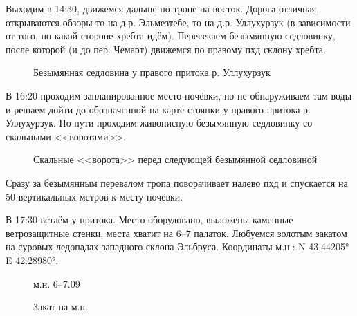 Выходим в 14:30, движемся дальше по тропе на восток. Дорога отличная, открываются обзоры то на д.р. Эльмезтебе, то на д.р. Уллухурзук (в зависимости от того, по какой стороне хребта идём). Пересекаем безымянную седловинку, после которой (и до пер. Чемарт) движемся по правому пхд склону хребта.

\begin{figure}[h!]
	\centering
	\caption{Безымянная седловина у правого притока р. Уллухурзук}
	\label{fig:saddle}
\end{figure}


В 16:20 проходим запланированное место ночёвки, но не обнаруживаем там воды и решаем дойти до обозначенной на карте стоянки у правого притока р. Уллухурзук. По пути проходим живописную безымянную седловинку со скальными <<воротами>>.

\begin{figure}[h!]
	\centering
	\caption{Скальные <<ворота>> перед следующей безымянной седловиной}
	\label{fig:gate}
\end{figure}
 
Сразу за безымянным перевалом тропа поворачивает налево пхд и спускается на 50 вертикальных метров к месту ночёвки.

В 17:30 встаём у притока. Место оборудовано, выложены каменные ветрозащитные стенки, места хватит на 6--7 палаток. Любуемся золотым закатом на суровых ледопадах западного склона Эльбруса. Координаты м.н.: N 43.44205° E 42.28980°.

\begin{figure}[h!]
	\centering
	\caption{м.н. 6--7.09}
	\label{fig:camp06_1}
\end{figure}


\begin{figure}[h!]
	\centering
	\caption{Закат на м.н.}
	\label{fig:camp06}
\end{figure}

\clearpage